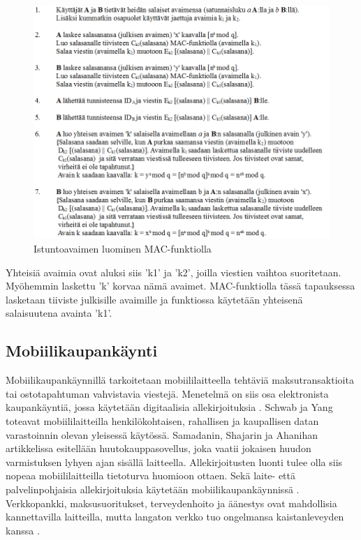 \documentclass[finnish]{tktltiki2}
\theoremstyle{definition}
\theoremstyle{remark}
\begin{document}
\begin{figure}[h!]
\centering
	\includegraphics[width=\textwidth]{algoritmis}
\caption{Istuntoavaimen luominen MAC-funktiolla \cite{MAC}}
\end{figure}	

Yhteisiä avaimia ovat aluksi siis 'k1' ja 'k2', joilla viestien vaihtoa suoritetaan. Myöhemmin laskettu 'k' korvaa nämä avaimet. MAC-funktiolla tässä tapauksessa lasketaan tiiviste julkisille avaimille ja funktiossa käytetään yhteisenä salaisuutena avainta 'k1'.


\subsection{Mobiilikaupankäynti}

Mobiilikaupankäynnillä tarkoitetaan mobiililaitteella tehtäviä maksutransaktioita tai ostotapahtuman vahvistavia viestejä. Menetelmä on siis osa elektronista kaupankäyntiä, jossa käytetään digitaalisia allekirjoituksia \cite{e-c}. Schwab ja Yang toteavat  \cite{enti} mobiililaitteilla henkilökohtaisen, rahallisen ja kaupallisen datan varastoinnin olevan yleisessä käytössä. Samadanin, Shajarin ja Ahanihan artikkelissa \cite{proxy} esitellään huutokauppasovellus, joka vaatii jokaisen huudon varmistuksen lyhyen ajan sisällä laitteella. Allekirjoitusten luonti tulee olla siis nopeaa mobiililaitteilla tietoturva huomioon ottaen. Sekä laite- että palvelinpohjaisia allekirjoituksia käytetään mobiilikaupankäynnissä \cite{proxy}. Verkkopankki, maksusuoritukset, terveydenhoito ja äänestys ovat mahdollisia kannettavilla laitteilla, mutta langaton verkko tuo ongelmansa kaistanleveyden kanssa \cite{ECC}. 
\end{document}
